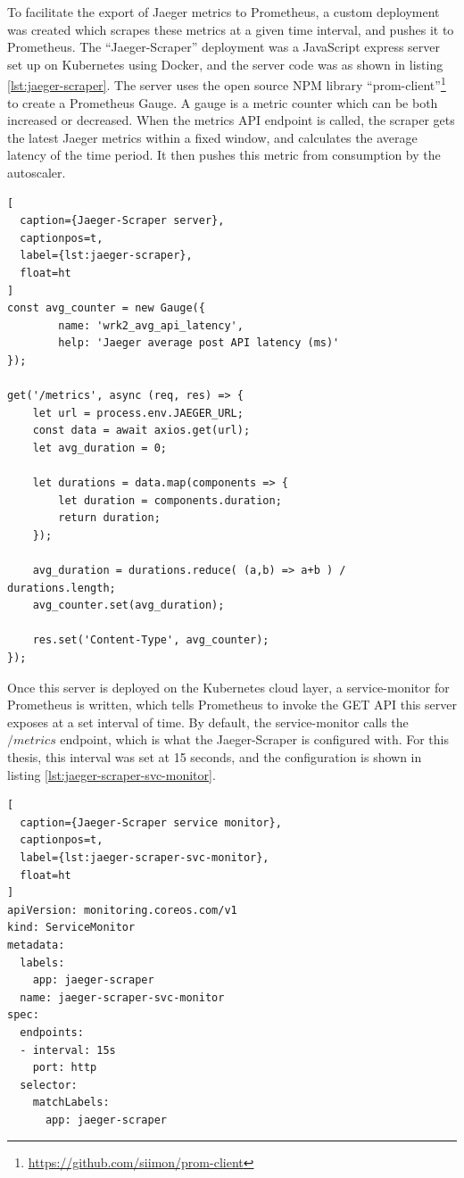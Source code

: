 To facilitate the export of Jaeger metrics to Prometheus, a custom deployment was created which scrapes these metrics at a given time interval, and pushes it to Prometheus. The ``Jaeger-Scraper'' deployment was a JavaScript express server set up on Kubernetes using Docker, and the server code was as shown in listing \ref{lst:jaeger-scraper}. The server uses the open source NPM library ``prom-client''\footnote{\url{https://github.com/siimon/prom-client}} to create a Prometheus Gauge. A gauge is a metric counter which can be both increased or decreased. When the metrics API endpoint is called, the scraper gets the latest Jaeger metrics within a fixed window, and calculates the average latency of the time period. It then pushes this metric from consumption by the autoscaler.

\begin{lstlisting}[
  caption={Jaeger-Scraper server},
  captionpos=t,
  label={lst:jaeger-scraper},
  float=ht
]
const avg_counter = new Gauge({
        name: 'wrk2_avg_api_latency',
        help: 'Jaeger average post API latency (ms)'
});

get('/metrics', async (req, res) => {
    let url = process.env.JAEGER_URL;
    const data = await axios.get(url);
    let avg_duration = 0;

    let durations = data.map(components => {
        let duration = components.duration;
        return duration;
    });

    avg_duration = durations.reduce( (a,b) => a+b ) / durations.length;
    avg_counter.set(avg_duration);

    res.set('Content-Type', avg_counter);
});
\end{lstlisting}

Once this server is deployed on the Kubernetes cloud layer, a service-monitor for Prometheus is written, which tells Prometheus to invoke the GET API this server exposes at a set interval of time. By default, the service-monitor calls the $/metrics$ endpoint, which is what the Jaeger-Scraper is configured with. For this thesis, this interval was set at 15 seconds, and the configuration is shown in listing \ref{lst:jaeger-scraper-svc-monitor}.

\begin{lstlisting}[
  caption={Jaeger-Scraper service monitor},
  captionpos=t,
  label={lst:jaeger-scraper-svc-monitor},
  float=ht
]
apiVersion: monitoring.coreos.com/v1
kind: ServiceMonitor
metadata:
  labels:
    app: jaeger-scraper
  name: jaeger-scraper-svc-monitor
spec:
  endpoints:
  - interval: 15s
    port: http
  selector:
    matchLabels:
      app: jaeger-scraper
\end{lstlisting}

